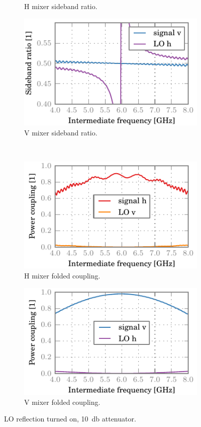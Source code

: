 \begin{figure}[hbtp]
\begin{subfigure}[b]{.5\textwidth}
        \caption{H mixer sideband ratio.}
    \end{subfigure}%
    \begin{subfigure}[b]{.5\textwidth}
        \includegraphics{chapter_3/13_lor_att10_v_sbr}%
        \caption{V mixer sideband ratio.}
    \end{subfigure}%
    \\
    \begin{subfigure}[b]{.5\textwidth}
        \includegraphics{chapter_3/13_lor_att10_h_ssb}%
        \caption{H mixer folded coupling.}
    \end{subfigure}%
    \begin{subfigure}[b]{.5\textwidth}
        \includegraphics{chapter_3/13_lor_att10_v_ssb}%
        \caption{V mixer folded coupling.}
    \end{subfigure}%
    \caption{LO reflection turned on, \SI{10}{\decibel} attenuator.}
    \label{fig:13_lor_att10}
\end{figure}

